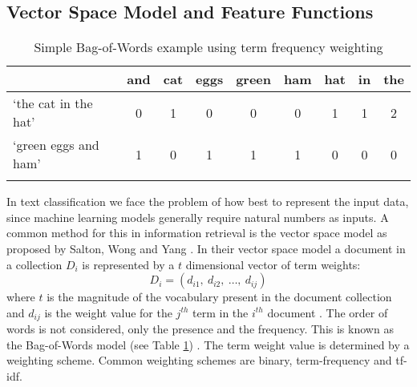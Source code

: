 \documentclass[Dissertation.tex]{subfiles}
\begin{document}
\subsection{Vector Space Model and Feature Functions}


\begin{table}[]
	\caption{Simple Bag-of-Words example using term frequency weighting}
	\label{bagOfWords}
	\centering
	\begin{tabular}{@{}lllllllll@{}}
		\toprule
		& and                    & cat                    & eggs                   & green                  & ham                    & hat                    & in                     & the                    \\ \midrule  \cline{2-9} 
		\multicolumn{1}{l|}{`the cat in the hat'} & \multicolumn{1}{c|}{0} & \multicolumn{1}{c|}{1} & \multicolumn{1}{c|}{0} & \multicolumn{1}{c|}{0} & \multicolumn{1}{c|}{0} & \multicolumn{1}{c|}{1} & \multicolumn{1}{c|}{1} & \multicolumn{1}{c|}{2} \\ \cline{2-9} 
		\multicolumn{1}{l|}{`green eggs and ham'} & \multicolumn{1}{c|}{1} & \multicolumn{1}{c|}{0} & \multicolumn{1}{c|}{1} & \multicolumn{1}{c|}{1} & \multicolumn{1}{c|}{1} & \multicolumn{1}{c|}{0} & \multicolumn{1}{c|}{0} & \multicolumn{1}{c|}{0} \\  \cline{2-9} 
		&                        &                        &                        &                        &                        &                        &                        &                        \\ \bottomrule
	\end{tabular}

\end{table}

In text classification we face the problem of how best to represent the input data, since machine learning models generally require natural numbers as inputs. A common method for this in information retrieval is the vector space model as proposed by Salton, Wong and Yang \cite{saltonVectorSpaceModel1975}. In their vector space model a document in a collection $ D_i $ is represented by a $ t $ dimensional vector of term weights: $$ D_i = (d_{i1},\ d_{i2},\ \dots,\ d_{ij})  $$ where $ t $ is the magnitude of the vocabulary present in the document collection and $ d_{ij} $ is the weight value for the $ j^{th} $ term in the $ i^{th} $ document \cite{saltonVectorSpaceModel1975}.
The order of words is not considered, only the presence and the frequency. This is known as the Bag-of-Words model (see Table \ref{bagOfWords}) \cite{jurafskySpeechLanguageProcessing}. The term weight value is determined by a weighting scheme. Common weighting schemes are binary, term-frequency and tf-idf.
\end{document}
